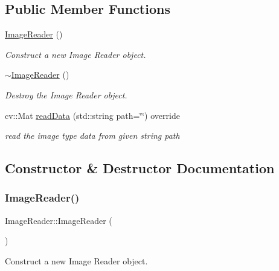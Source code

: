 \subsection*{Public Member Functions}
\begin{DoxyCompactItemize}
\item 
\hyperlink{classImageReader_a2b24331603b06f5c218212c26a3ee24b}{Image\+Reader} ()
\begin{DoxyCompactList}\small\item\em Construct a new Image Reader object. \end{DoxyCompactList}\item 
\mbox{\label{classImageReader_a4d5b604cbc552bd86d9ec357139fd61e}} 
\hyperlink{classImageReader_a4d5b604cbc552bd86d9ec357139fd61e}{$\sim$\+Image\+Reader} ()
\begin{DoxyCompactList}\small\item\em Destroy the Image Reader object. \end{DoxyCompactList}\item 
cv\+::\+Mat \hyperlink{classImageReader_a453f68fc55ae911476514068873f9a3f}{read\+Data} (std\+::string path=\char`\"{}\char`\"{}) override
\begin{DoxyCompactList}\small\item\em read the image type data from given string path \end{DoxyCompactList}\end{DoxyCompactItemize}


\subsection{Constructor \& Destructor Documentation}
\mbox{\label{classImageReader_a2b24331603b06f5c218212c26a3ee24b}} 
\subsubsection{\texorpdfstring{Image\+Reader()}{ImageReader()}}
{\footnotesize\ttfamily Image\+Reader\+::\+Image\+Reader (\begin{DoxyParamCaption}{ }\end{DoxyParamCaption})}



Construct a new Image Reader object. 

